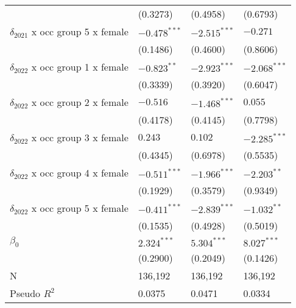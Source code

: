 \begin{tabular}{llll}
                                         &           (0.3273) &           (0.4958) &           (0.6793) \\
$\delta_{2021}$ x occ group 5 x female   &     $-0.478^{***}$ &     $-2.515^{***}$ &           $-0.271$ \\
                                         &           (0.1486) &           (0.4600) &           (0.8606) \\
$\delta_{2022}$ x occ group 1 x female   &      $-0.823^{**}$ &     $-2.923^{***}$ &     $-2.068^{***}$ \\
                                         &           (0.3339) &           (0.3920) &           (0.6047) \\
$\delta_{2022}$ x occ group 2 x female   &           $-0.516$ &     $-1.468^{***}$ &            $0.055$ \\
                                         &           (0.4178) &           (0.4145) &           (0.7798) \\
$\delta_{2022}$ x occ group 3 x female   &            $0.243$ &            $0.102$ &     $-2.285^{***}$ \\
                                         &           (0.4345) &           (0.6978) &           (0.5535) \\
$\delta_{2022}$ x occ group 4 x female   &     $-0.511^{***}$ &     $-1.966^{***}$ &      $-2.203^{**}$ \\
                                         &           (0.1929) &           (0.3579) &           (0.9349) \\
$\delta_{2022}$ x occ group 5 x female   &     $-0.411^{***}$ &     $-2.839^{***}$ &      $-1.032^{**}$ \\
                                         &           (0.1535) &           (0.4928) &           (0.5019) \\
$\beta_0$                                &      $2.324^{***}$ &      $5.304^{***}$ &      $8.027^{***}$ \\
                                         &           (0.2900) &           (0.2049) &           (0.1426) \\
N                                        &            136,192 &            136,192 &            136,192 \\
Pseudo $R^2$                             &             0.0375 &             0.0471 &             0.0334 \\
\bottomrule
\end{tabular}
